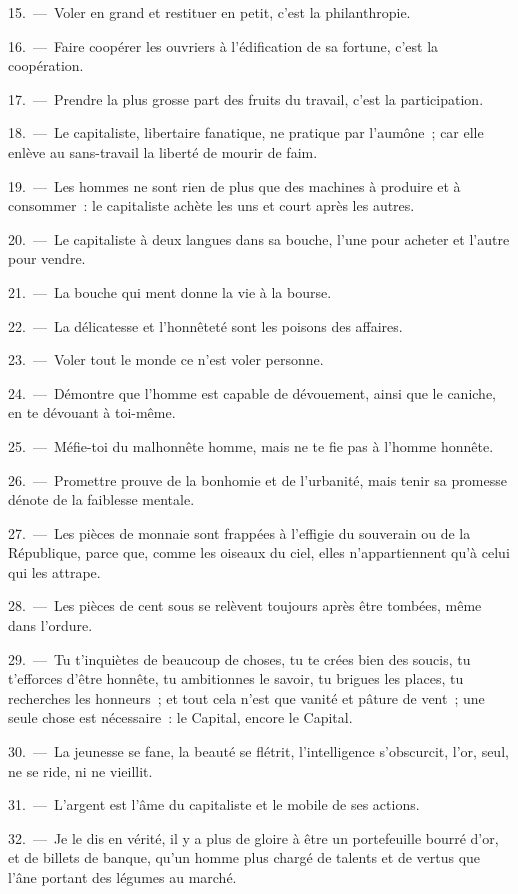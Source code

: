 \documentclass[french,twoside]{book} %
\begin{document}
15. — Voler en grand et restituer en petit, c’est la philanthropie.\par
16. — Faire coopérer les ouvriers à l’édification de sa fortune, c’est la coopération.\par
17. — Prendre la plus grosse part des fruits du travail, c’est la participation.\par
18. — Le capitaliste, libertaire fanatique, ne pratique par l’aumône ; car elle enlève au sans-travail la liberté de mourir de faim.\par
19. — Les hommes ne sont rien de plus que des machines à produire et à consommer : le capitaliste achète les uns et court après les autres.\par
20. — Le capitaliste à deux langues dans sa bouche, l’une pour acheter et l’autre pour vendre.\par
21. — La bouche qui ment donne la vie à la bourse.\par
22. — La délicatesse et l’honnêteté sont les poisons des affaires.\par
23. — Voler tout le monde ce n’est voler personne.\par
24. — Démontre que l’homme est capable de dévouement, ainsi que le caniche, en te dévouant à toi-même.\par
25. — Méfie-toi du malhonnête homme, mais ne te fie pas à l’homme honnête.\par
26. — Promettre prouve de la bonhomie et de l’urbanité, mais tenir sa promesse dénote de la faiblesse mentale.\par
27. — Les pièces de monnaie sont frappées à l’effigie du souverain ou de la République, parce que, comme les oiseaux du ciel, elles n’appartiennent qu’à celui qui les attrape.\par
28. — Les pièces de cent sous se relèvent toujours après être tombées, même dans l’ordure.\par
29. — Tu t’inquiètes de beaucoup de choses, tu te crées bien des soucis, tu t’efforces d’être honnête, tu ambitionnes le savoir, tu brigues les places, tu recherches les honneurs ; et tout cela n’est que vanité et pâture de vent ; une seule chose est nécessaire : le Capital, encore le Capital.\par
30. — La jeunesse se fane, la beauté se flétrit, l’intelligence s’obscurcit, l’or, seul, ne se ride, ni ne vieillit.\par
31. — L'argent est l’âme du capitaliste et le mobile de ses actions.\par
32. — Je le dis en vérité, il y a plus de gloire à être un portefeuille bourré d’or, et de billets de banque, qu’un homme plus chargé de talents et de vertus que l’âne portant des légumes au marché.\par
\end{document}
